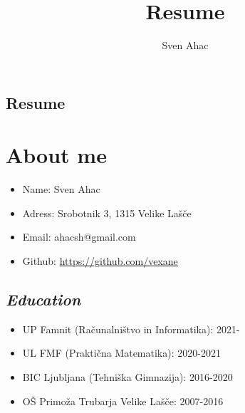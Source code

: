 \documentclass[a4paper]{article}
\title{Resume}
\author{Sven Ahac}
\begin{document}
\begin{center}
    \section*{\Huge Resume}
\end{center}
\section{About me}
\begin{itemize}
    \item Name: Sven Ahac
    \item Adress: Srobotnik 3, 1315 Velike Lašče
    \item Email: ahacsh@gmail.com
    \item Github: \url{https://github.com/vexane}
\end{itemize}
\subsection{\emph{Education}}
\begin{itemize}
    \item UP Famnit (Računalništvo in Informatika): 2021-
    \item UL FMF (Praktična Matematika): 2020-2021
    \item BIC Ljubljana (Tehniška Gimnazija): 2016-2020
    \item OŠ Primoža Trubarja Velike Lašče: 2007-2016
\end{itemize}
\end{document}

